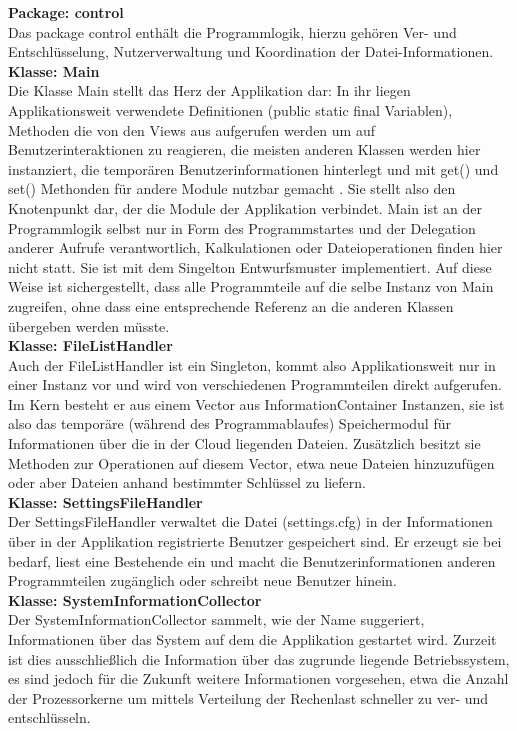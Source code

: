 \documentclass[12pt,a4paper,bibliography=totocnumbered,listof=totocnumbered]{scrartcl}
\begin{document}
\textbf{Package: control}\\
Das package control enthält die Programmlogik, hierzu gehören Ver- und Entschlüsselung, Nutzerverwaltung und Koordination der Datei-Informationen.\\
\textbf{Klasse: Main}\\
Die Klasse Main stellt das Herz der Applikation dar: In ihr liegen Applikationsweit verwendete Definitionen (public static final Variablen), Methoden die von den Views aus aufgerufen werden um auf Benutzerinteraktionen zu reagieren, die meisten anderen Klassen werden hier instanziert, die temporären Benutzerinformationen hinterlegt und mit get() und set() Methonden für andere Module nutzbar gemacht . Sie stellt also den Knotenpunkt dar, der die Module der Applikation verbindet. Main ist an der Programmlogik selbst nur in Form des Programmstartes und der Delegation anderer Aufrufe verantwortlich, Kalkulationen oder Dateioperationen finden hier nicht statt. Sie ist mit dem Singelton Entwurfsmuster implementiert. Auf diese Weise ist sichergestellt, dass alle Programmteile auf die selbe Instanz von Main zugreifen, ohne dass eine entsprechende Referenz an die anderen Klassen übergeben werden müsste.\\
\textbf{Klasse: FileListHandler}\\
Auch der FileListHandler ist ein Singleton, kommt also Applikationsweit nur in einer Instanz vor und wird von verschiedenen Programmteilen direkt aufgerufen. Im Kern besteht er aus einem Vector aus InformationContainer Instanzen, sie ist also das temporäre (während des Programmablaufes) Speichermodul für Informationen über die in der Cloud liegenden Dateien. Zusätzlich besitzt sie Methoden zur Operationen auf diesem Vector, etwa neue Dateien hinzuzufügen oder aber Dateien anhand bestimmter Schlüssel zu liefern.\\
\textbf{Klasse: SettingsFileHandler}\\
Der SettingsFileHandler verwaltet die Datei (settings.cfg) in der Informationen über in der Applikation registrierte Benutzer gespeichert sind. Er erzeugt sie bei bedarf, liest eine Bestehende ein und macht die Benutzerinformationen anderen Programmteilen zugänglich oder schreibt neue Benutzer hinein.\\
\textbf{Klasse: SystemInformationCollector}\\
Der SystemInformationCollector sammelt, wie der Name suggeriert, Informationen über das System auf dem die Applikation gestartet wird. Zurzeit ist dies ausschließlich die Information über das zugrunde liegende Betriebssystem, es sind jedoch für die Zukunft weitere Informationen vorgesehen, etwa die Anzahl der Prozessorkerne um mittels Verteilung der Rechenlast schneller zu ver- und entschlüsseln.\\
\end{document}

